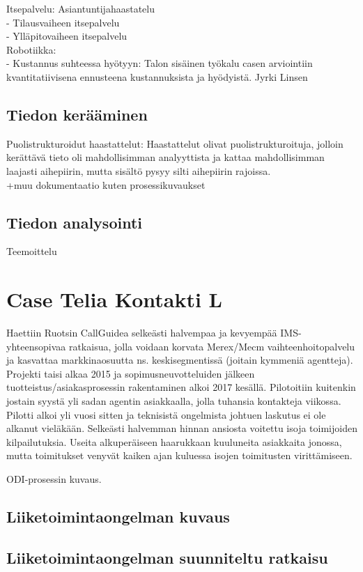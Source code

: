 \documentclass[finnish,12pt,a4paper,pdftex]{article}
\begin{document}
Itsepalvelu: Asiantuntijahaastatelu\\
- Tilausvaiheen itsepalvelu\\
- Ylläpitovaiheen itsepalvelu\\

Robotiikka:\\
- Kustannus suhteessa hyötyyn: Talon sisäinen työkalu casen arviointiin kvantitatiivisena ennusteena kustannuksista ja hyödyistä. Jyrki Linsen

\subsection{Tiedon kerääminen}

Puolistrukturoidut haastattelut:  Haastattelut olivat
puolistrukturoituja, jolloin kerättävä tieto oli mahdollisimman analyyttista ja
kattaa mahdollisimman laajasti aihepiirin, mutta sisältö pysyy silti aihepiirin
rajoissa.\\
+muu dokumentaatio kuten prosessikuvaukset


\subsection{Tiedon analysointi}
Teemoittelu

\section{Case Telia Kontakti L}
Haettiin Ruotsin CallGuidea selkeästi halvempaa ja kevyempää IMS-yhteensopivaa ratkaisua, jolla voidaan korvata Merex/Mecm vaihteenhoitopalvelu ja kasvattaa markkinaosuutta ns. keskisegmentissä (joitain kymmeniä agentteja). Projekti taisi alkaa 2015 ja sopimusneuvotteluiden jälkeen tuotteistus/asiakasprosessin rakentaminen alkoi 2017 kesällä. Pilotoitiin kuitenkin jostain syystä yli sadan agentin asiakkaalla, jolla tuhansia kontakteja viikossa. Pilotti alkoi yli vuosi sitten ja teknisistä ongelmista johtuen laskutus ei ole alkanut vieläkään. Selkeästi halvemman hinnan ansiosta voitettu isoja toimijoiden kilpailutuksia. Useita alkuperäiseen haarukkaan kuuluneita asiakkaita jonossa, mutta toimitukset venyvät kaiken ajan kuluessa isojen toimitusten virittämiseen.

ODI-prosessin kuvaus.

\subsection{Liiketoimintaongelman kuvaus}
\subsection{Liiketoimintaongelman suunniteltu ratkaisu}
\end{document}
